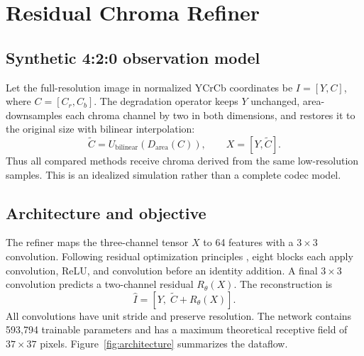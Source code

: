 \documentclass[10pt,twocolumn]{article}
\begin{document}
\section{Residual Chroma Refiner}

\subsection{Synthetic 4:2:0 observation model}

Let the full-resolution image in normalized YCrCb coordinates be
$I=[Y,C]$, where $C=[C_r,C_b]$.  The degradation operator keeps $Y$ unchanged,
area-downsamples each chroma channel by two in both dimensions, and restores it
to the original size with bilinear interpolation:
\begin{equation}
  \widetilde{C}=U_{\mathrm{bilinear}}\!\left(D_{\mathrm{area}}(C)\right),
  \qquad X=[Y,\widetilde{C}].
  \label{eq:degradation}
\end{equation}
Thus all compared methods receive chroma derived from the same low-resolution
samples.  This is an idealized simulation rather than a complete codec model.

\subsection{Architecture and objective}

The refiner maps the three-channel tensor $X$ to 64 features with a $3\!\times\!3$
convolution.  Following residual optimization principles
\cite{he2016resnet}, eight blocks each apply convolution, ReLU, and convolution
before an identity addition.  A final $3\!\times\!3$ convolution predicts a
two-channel residual $R_\theta(X)$.  The reconstruction is
\begin{equation}
  \widehat{I}=\left[Y,\;\widetilde{C}+R_\theta(X)\right].
  \label{eq:model}
\end{equation}
All convolutions have unit stride and preserve resolution.  The network contains
593,794 trainable parameters and has a maximum theoretical receptive field of
$37\!\times\!37$ pixels.  Figure~\ref{fig:architecture} summarizes the dataflow.
\end{document}
